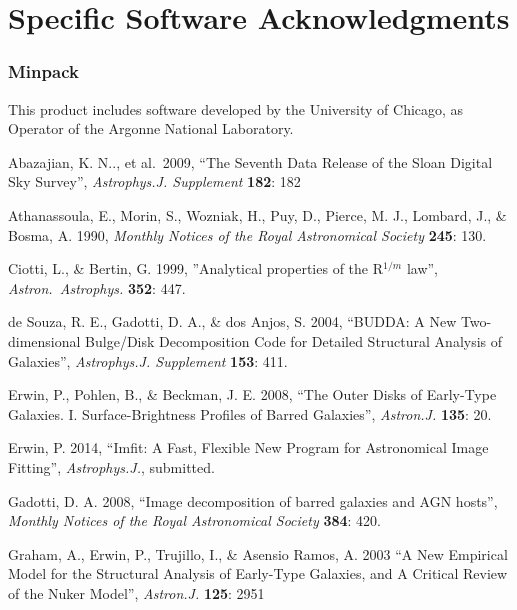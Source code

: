 \documentclass[10pt,a4paper,article]{memoir}
\begin{document}
\section{Specific Software Acknowledgments}

\subsubsection{Minpack}
This product includes software developed by the University of Chicago, as Operator of
the Argonne National Laboratory.





\begin{thebibliography}{}


 Abazajian, K. N.., et al.\ 2009, ``The Seventh 
Data Release of the Sloan Digital Sky Survey'', \textit{Astrophys.J. Supplement} \textbf{182}: 182

 Athanassoula, E., Morin, S., Wozniak, H.,
Puy, D., Pierce, M. J., Lombard, J., \& Bosma, A. 1990, \textit{Monthly Notices of the Royal
Astronomical Society} \textbf{245}: 130.

 Ciotti, L., \& Bertin, G. 1999,
''Analytical properties of the R$^{1/m}$ law'', \textit{Astron.\ Astrophys.}
\textbf{352}: 447.

 de Souza, R. E.,
Gadotti, D. A., \& dos Anjos, S. 2004, ``BUDDA: A New Two-dimensional Bulge/Disk
Decomposition Code for Detailed Structural Analysis of Galaxies'',
\textit{Astrophys.J. Supplement} \textbf{153}: 411.

 Erwin, P.,
Pohlen, B., \& Beckman, J. E. 2008, ``The Outer Disks of Early-Type Galaxies. I. 
Surface-Brightness Profiles of Barred Galaxies'', \textit{Astron.J.} \textbf{135}: 20.

 Erwin, P. 2014, ``Imfit: A Fast, Flexible
New Program for Astronomical Image Fitting'', \textit{Astrophys.J.}, submitted.

 Gadotti, D. A. 2008, ``Image
decomposition of barred galaxies and AGN hosts'', \textit{Monthly
Notices of the Royal Astronomical Society} \textbf{384}: 420.

 Graham, A., Erwin, P., Trujillo, I., \&
Asensio Ramos, A. 2003 ``A New Empirical Model for the Structural Analysis of
Early-Type Galaxies, and A Critical Review of the Nuker Model'',
\textit{Astron.J.} \textbf{125}: 2951


\end{thebibliography}
\end{document}
